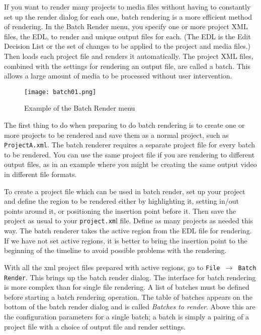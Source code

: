 If you want to render many projects to media files without having to constantly set up the render dialog for each one, batch rendering is a more efficient method of rendering.  In the Batch Render menu, you specify one or more \CGG{} project XML files, the EDL, to render and unique output files for each. (The EDL is the Edit Decision List or the set of changes to be applied to the project and media files.) Then \CGG{} loads each project file and renders it automatically. The project XML files, combined with the settings for rendering an output file, are called a batch.  This allows a large amount of media to be processed without user intervention.

\begin{figure}[htpb]
    \centering
    \texttt{[image: batch01.png]}
    \caption{Example of the Batch Render menu}
    \label{fig:batch01}
\end{figure}

The first thing to do when preparing to do batch rendering is to create one or more \CGG{} projects to be rendered and save them as a normal project, such as \texttt{ProjectA.xml}.  The batch renderer requires a separate project file for every batch to be rendered.  You can use the same \CGG{} project file if you are rendering to different output files, as in an example where you might be creating the same output video in different file formats.

To create a project file which can be used in batch render, set up your project and define the region to be rendered either by highlighting it, setting in/out points around it, or positioning the insertion point before it. Then save the project as usual to your \texttt{project.xm}l file. Define as many projects as needed this way.  The batch renderer takes the active region from the EDL file for rendering. If we have not set active regions, it is better to bring the insertion point to the beginning of the timeline to avoid possible problems with the rendering.

With all the \CGG{} xml project files prepared with active regions, go to \texttt{File $\rightarrow$ Batch Render}. This brings up the batch render dialog. The interface for batch rendering is more complex than for single file rendering.  A list of batches must be defined before starting a batch rendering operation.  The table of batches appears on the bottom of the batch render dialog and is called \textit{Batches to render}.  Above this are the configuration parameters for a single batch; a batch is simply a pairing of a project file with a choice of output file and render settings.

